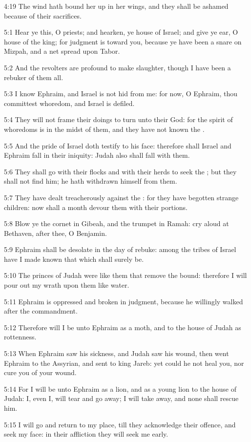4:19 The wind hath bound her up in her wings, and they shall be
ashamed because of their sacrifices.

5:1 Hear ye this, O priests; and hearken, ye house of Israel; and give
ye ear, O house of the king; for judgment is toward you, because ye
have been a snare on Mizpah, and a net spread upon Tabor.

5:2 And the revolters are profound to make slaughter, though I have
been a rebuker of them all.

5:3 I know Ephraim, and Israel is not hid from me: for now, O Ephraim,
thou committest whoredom, and Israel is defiled.

5:4 They will not frame their doings to turn unto their God: for the
spirit of whoredoms is in the midst of them, and they have not known
the \LORD.

5:5 And the pride of Israel doth testify to his face: therefore shall
Israel and Ephraim fall in their iniquity: Judah also shall fall with
them.

5:6 They shall go with their flocks and with their herds to seek the
\LORD; but they shall not find him; he hath withdrawn himself from
them.

5:7 They have dealt treacherously against the \LORD: for they have
begotten strange children: now shall a month devour them with their
portions.

5:8 Blow ye the cornet in Gibeah, and the trumpet in Ramah: cry aloud
at Bethaven, after thee, O Benjamin.

5:9 Ephraim shall be desolate in the day of rebuke: among the tribes
of Israel have I made known that which shall surely be.

5:10 The princes of Judah were like them that remove the bound:
therefore I will pour out my wrath upon them like water.

5:11 Ephraim is oppressed and broken in judgment, because he willingly
walked after the commandment.

5:12 Therefore will I be unto Ephraim as a moth, and to the house of
Judah as rottenness.

5:13 When Ephraim saw his sickness, and Judah saw his wound, then went
Ephraim to the Assyrian, and sent to king Jareb: yet could he not heal
you, nor cure you of your wound.

5:14 For I will be unto Ephraim as a lion, and as a young lion to the
house of Judah: I, even I, will tear and go away; I will take away,
and none shall rescue him.

5:15 I will go and return to my place, till they acknowledge their
offence, and seek my face: in their affliction they will seek me
early.

